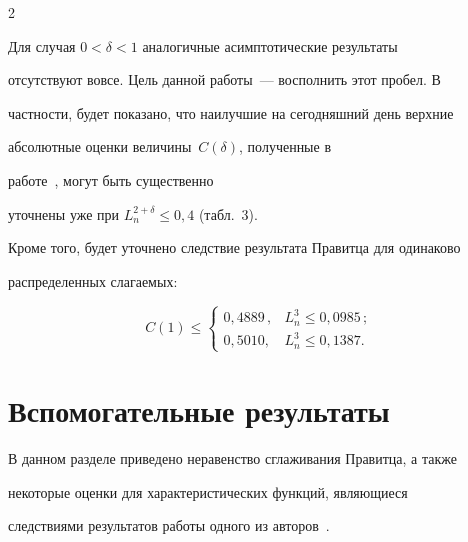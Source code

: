 \begin{multicols}{2}
\vspace*{6pt}








\bigskip


\addtocounter{table}{1}





Для случая ${0<\delta<1}$ аналогичные асимптотические результаты


отсутствуют вовсе. Цель данной работы~--- восполнить этот пробел. В


частности, будет показано, что наилучшие на сегодняшний день верхние


абсолютные оценки величины~$C(\delta)$, полученные в


работе~\cite{GaponovaKorchaginShevtsova2009}, могут быть существенно


уточнены уже при $L_n^{2+\delta}\le0{,}4$ (табл.~3).








Кроме того, будет уточнено следствие результата Правитца для одинаково


распределенных слагаемых:


$$


C(1)\le


\begin{cases}


0{,}4889\,,&L_n^3\le0{,}0985\,;\\


0{,}5010,&L_n^3\le0{,}1387.


\end{cases}


$$





\section{Вспомогательные результаты}





В данном разделе приведено неравенство сглаживания Правитца, а также


некоторые оценки для характеристических функций, являющиеся


следствиями результатов работы одного из авторов~\cite{Shevtsova2009}.






\end{multicols}
